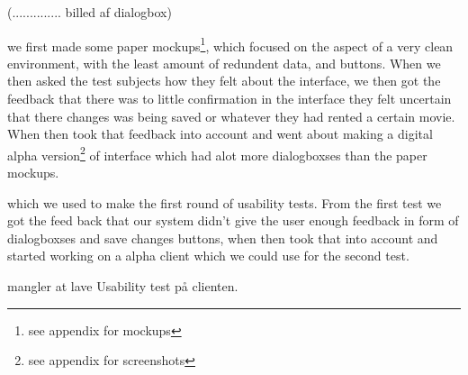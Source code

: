 (.............. billed af dialogbox)

 we first made some paper mockups\footnote{see appendix for mockups}, which focused on the aspect of a very clean environment, with the least amount of redundent data, and buttons. When we then asked the test subjects how they felt about the interface, we then got the feedback that there was to little confirmation in the interface they felt uncertain that there changes was being saved or whatever they had rented a certain movie. When then took that feedback into account and went about making a digital alpha version\footnote{see appendix for screenshots} of interface which had alot more dialogboxses than the paper mockups.


 which we used to make the first round of usability tests. From the first test we got the feed back that our system didn't give the user enough feedback in form of dialogboxses and save changes buttons, when then took that into account and started working on a alpha client which we could use for the second test.





mangler at lave Usability test på clienten.